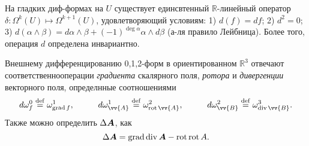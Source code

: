 \begin{to_lem} 
    На гладких диф-формах на $U$ существует единсвтенный $\mathbb{R}$-линейный оператор $\delta \colon \Omega^k (U) \mapsto \Omega^{k+1} (U)$, удовлетворяющий условиям: 
    1) $d(f) = df$;
    2) $d^2 = 0$;
    3) $d(\alpha \wedge \beta) = d \alpha \wedge \beta + (-1)^{\deg \alpha} \alpha \wedge d \beta$ (а-ля правило Лейбница).
    Более того, операция $d$ определена инвариантно.
\end{to_lem}


\begin{to_def} 
    Внешнему дифференцированию 0,1,2-форм в ориентированном $\mathbb{R}^3$ отвечают соответственнооперации \textit{градиента} скалярного поля, \textit{ротора} и \textit{дивергенции} векторного поля, определнные соотношениями
\begin{equation*}
     d \omega^0_f \overset{\mathrm{def}}{=} \omega^1_{\grad f}, \hspace{1cm} 
     d \omega^1_{\vv{A}} \overset{\mathrm{def}}{=} \omega^2_{\rot \vv{A}}, \hspace{1cm} 
     d \omega^2_{\vv{B}} \overset{\mathrm{def}}{=} \omega^3_{\div \vv{B}}.
 \end{equation*} 
    Также можно определить $\Delta \mbox{\boldmath $A$}$, как
\begin{equation*}
    \Delta \mbox{\boldmath $A$} = \mathop{\mathrm{grad}}\nolimits \mathop{\mathrm{div}}\nolimits \mbox{\boldmath $A$} - \mathop{\mathrm{rot}}\nolimits \mathop{\mathrm{rot}}\nolimits A.
\end{equation*}
\end{to_def}





